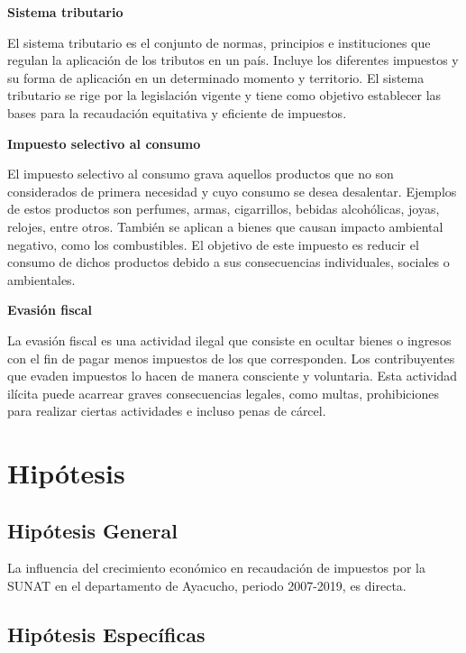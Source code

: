 \documentclass[
  letterpaper,
]{article}
\begin{document}
\textbf{Sistema tributario}

El sistema tributario es el conjunto de normas, principios e
instituciones que regulan la aplicación de los tributos en un país.
Incluye los diferentes impuestos y su forma de aplicación en un
determinado momento y territorio. El sistema tributario se rige por la
legislación vigente y tiene como objetivo establecer las bases para la
recaudación equitativa y eficiente de impuestos.

\textbf{Impuesto selectivo al consumo}

El impuesto selectivo al consumo grava aquellos productos que no son
considerados de primera necesidad y cuyo consumo se desea desalentar.
Ejemplos de estos productos son perfumes, armas, cigarrillos, bebidas
alcohólicas, joyas, relojes, entre otros. También se aplican a bienes
que causan impacto ambiental negativo, como los combustibles. El
objetivo de este impuesto es reducir el consumo de dichos productos
debido a sus consecuencias individuales, sociales o ambientales.

\textbf{Evasión fiscal}

La evasión fiscal es una actividad ilegal que consiste en ocultar bienes
o ingresos con el fin de pagar menos impuestos de los que corresponden.
Los contribuyentes que evaden impuestos lo hacen de manera consciente y
voluntaria. Esta actividad ilícita puede acarrear graves consecuencias
legales, como multas, prohibiciones para realizar ciertas actividades e
incluso penas de cárcel.

\hypertarget{hipuxf3tesis}{%
\section{Hipótesis}\label{hipuxf3tesis}}

\hypertarget{hipuxf3tesis-general}{%
\subsection{Hipótesis General}\label{hipuxf3tesis-general}}

La influencia del crecimiento económico en recaudación de impuestos por
la SUNAT en el departamento de Ayacucho, periodo 2007-2019, es directa.

\hypertarget{hipuxf3tesis-especuxedficas}{%
\subsection{Hipótesis Específicas}\label{hipuxf3tesis-especuxedficas}}
\end{document}
